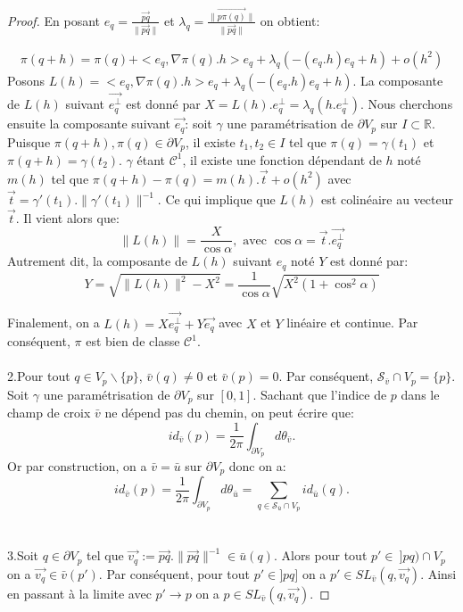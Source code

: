 \begin{proof}
En posant $e_q=\displaystyle\frac{\overrightarrow{pq}}{\|\overrightarrow{pq}\|}$ et $\lambda_q=\displaystyle\frac{\|\overrightarrow{p\pi(q)}\|}{\|\overrightarrow{pq}\|}$ on obtient:

\begin{eqnarray*}
    \pi(q+h) = \pi(q)+<e_q,\nabla\pi(q).h>e_q+\lambda_q(-(e_q.h)e_q+h)+o(h^2)
\end{eqnarray*}
Posons $L(h)=<e_q,\nabla\pi(q).h>e_q+\lambda_q(-(e_q.h)e_q+h)$. La composante de $L(h)$ suivant $\overrightarrow{e_q^\perp}$ est donné par $X=L(h).e_q^\perp=\lambda_q(h.e_q^\perp)$. Nous cherchons ensuite la composante suivant $\overrightarrow{e_q}$: soit $\gamma$ une paramétrisation de $\partial V_p$ sur $I\subset\mathbb{R}$. Puisque $\pi(q+h),\pi(q)\in\partial V_p$, il existe $t_1, t_2\in I$ tel que $\pi(q)=\gamma(t_1)$ et $\pi(q+h)=\gamma(t_2)$. $\gamma$ étant $\mathcal{C}^1$, il existe une fonction dépendant de $h$ noté $m(h)$ tel que $\pi(q+h)-\pi(q)=m(h).\overrightarrow{t}+o(h^2)$ avec $\overrightarrow{t}=\gamma'(t_1).\|\gamma'(t_1)\|^{-1}$. Ce qui implique que $L(h)$ est colinéaire au vecteur $\overrightarrow{t}$. Il vient alors que:
$$
\|L(h)\|=\frac{X}{\cos{\alpha}},\mbox{ avec }\cos{\alpha}=\overrightarrow{t}.\overrightarrow{e_q^\perp}
$$
Autrement dit, la composante de $L(h)$ suivant $e_q$ noté $Y$ est donné par:
$$
Y=\sqrt{\|L(h)\|^2-X^2}=\frac{1}{\cos{\alpha}}\sqrt{X^2(1+\cos^2\alpha)}
$$

Finalement, on a $L(h)=X\overrightarrow{e_q^\perp}+ Y\overrightarrow{e_q}$ avec $X$ et $Y$ linéaire et continue. Par conséquent, $\pi$ est bien de classe $\mathcal{C}^1$.\\\\
2.\quad Pour tout $q\in V_p\backslash\{p\}$, $\bar{v}(q)\neq 0$ et $\bar{v}(p)=0$. Par conséquent, $\mathcal{S}_{\bar{v}}\cap V_p=\{p\}$. Soit $\gamma$ une paramétrisation de $\partial V_p$ sur $[0, 1]$. Sachant que l'indice de $p$ dans le champ de croix $\bar{v}$ ne dépend pas du chemin, on peut écrire que:
$$id_{\bar{v}}(p)=\frac{1}{2\pi}\int_{\partial V_p}d\theta_{\bar{v}}.$$
Or par construction, on a $\bar{v}=\bar{u}$ sur $\partial V_p$ donc on a:
$$id_{\bar{v}}(p)=\frac{1}{2\pi}\int_{\partial V_p}d\theta_{\bar{u}}=\sum_{q\in\mathcal{S}_{\bar{u}}\cap V_p}id_{\bar{u}}(q).$$\\\\
3.\quad Soit $q\in\partial V_p$ tel que $\overrightarrow{v_q}:=\overrightarrow{pq}.\|\overrightarrow{pq}\|^{-1} \in \bar{u}(q)$. Alors pour tout $p'\in~]pq)\cap V_p$ on a $\overrightarrow{v_q}\in\bar{v}(p')$. Par conséquent, pour tout $p'\in]pq]$ on a $p'\in SL_{\bar{v}}(q,\overrightarrow{v_q})$. Ainsi en passant à la limite avec $p'\longrightarrow p$ on a $p\in SL_{\bar{v}}(q,\overrightarrow{v_q})$.
\end{proof}

